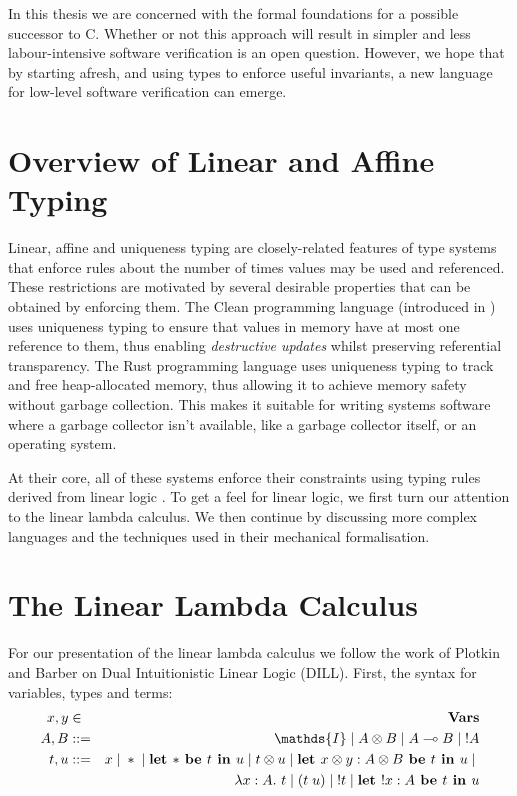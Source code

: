 \documentclass[]{unswthesis}
\newcommand{\lam}[1]{\lambda #1 \ldotp \,}
\newcommand{\app}[2]{(#1 \; #2)}
\newcommand{\lolly}{\multimap}
\newcommand{\letbe}[3]{\textbf{let $#1$ be $#2$ in $#3$}}
\newcommand{\sor}{\; | \;}
\let\i\textit
\let\b\textbf
\begin{document}
In this thesis we are concerned with the formal foundations for a possible successor to C. Whether or not this approach will result in simpler and less labour-intensive software verification is an open question. However, we hope that by starting afresh, and using types to enforce useful invariants, a new language for low-level software verification can emerge.

\section{Overview of Linear and Affine Typing}

Linear, affine and uniqueness typing are closely-related features of type systems that enforce rules about the number of times values may be used and referenced. These restrictions are motivated by several desirable properties that can be obtained by enforcing them. The Clean programming language (introduced in \cite{clean87}) uses uniqueness typing to ensure that values in memory have at most one reference to them, thus enabling \i{destructive updates} whilst preserving referential transparency. The Rust programming language \cite{rustWeb} uses uniqueness typing to track and free heap-allocated memory, thus allowing it to achieve memory safety without garbage collection. This makes it suitable for writing systems software where a garbage collector isn't available, like a garbage collector itself, or an operating system.

At their core, all of these systems enforce their constraints using typing rules derived from linear logic \cite{girard87}. To get a feel for linear logic, we first turn our attention to the linear lambda calculus. We then continue by discussing more complex languages and the techniques used in their mechanical formalisation.

\section{The Linear Lambda Calculus}

For our presentation of the linear lambda calculus we follow the work of Plotkin and Barber \cite{barber96} on Dual Intuitionistic Linear Logic (DILL). First, the syntax for variables, types and terms:
\begin{eqnarray*}
x,y & \in & \b{Vars} \\
A, B & ::= & \mathds{I} \sor A \otimes B \sor A \lolly B \sor {!A} \\
t, u & ::= & x \sor * \sor \letbe{*}{t}{u} \sor t \otimes u \sor \letbe{x \otimes y : A \otimes B}{t}{u} \sor \\
  &     & \lam{x : A} t \sor \app{t}{u} \sor {!t} \sor \letbe{!x : A}{t}{u}
\end{eqnarray*}
\end{document}
